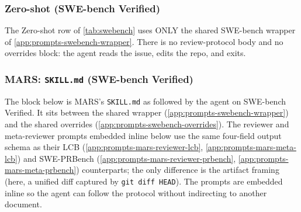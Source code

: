 \documentclass{article}
\begin{document}
\subsubsection{Zero-shot (SWE-bench Verified)}
\label{app:prompts-swebench-zeroshot}

The Zero-shot row of \autoref{tab:swebench} uses ONLY the shared
SWE-bench wrapper of \autoref{app:prompts-swebench-wrapper}. There
is no review-protocol body and no overrides block: the agent reads
the issue, edits the repo, and exits.

\subsubsection{MARS: \texttt{SKILL.md} (SWE-bench Verified)}
\label{app:prompts-swebench-mars-body}

The block below is MARS's \texttt{SKILL.md} as followed by the agent
on SWE-bench Verified. It sits between the shared wrapper
(\autoref{app:prompts-swebench-wrapper}) and the shared overrides
(\autoref{app:prompts-swebench-overrides}). The reviewer and
meta-reviewer prompts embedded inline below use the same four-field
output schema as their LCB
(\autoref{app:prompts-mars-reviewer-lcb},
\autoref{app:prompts-mars-meta-lcb}) and SWE-PRBench
(\autoref{app:prompts-mars-reviewer-prbench},
\autoref{app:prompts-mars-meta-prbench}) counterparts; the only
difference is the artifact framing (here, a unified diff captured by
\texttt{git diff HEAD}). The prompts are embedded inline so the agent
can follow the protocol without indirecting to another document.
\end{document}

